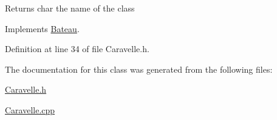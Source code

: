 \begin{DoxyReturn}{Returns}
char the name of the class 
\end{DoxyReturn}


Implements \hyperlink{class_bateau_ad6775916a45ddbe18a9f06df79e2ba6f}{Bateau}.



Definition at line 34 of file Caravelle.h.



The documentation for this class was generated from the following files:\begin{DoxyCompactItemize}
\item 
\hyperlink{_caravelle_8h}{Caravelle.h}\item 
\hyperlink{_caravelle_8cpp}{Caravelle.cpp}\end{DoxyCompactItemize}

